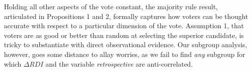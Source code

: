 \documentclass[11pt]{article}
\begin{document}

Holding all other aspects of the vote constant, the majority rule result, articulated in Propositions 1 and 2, formally captures  how voters can be thought accurate with respect to a particular dimension of the vote. %
Assumption 1, that voters are as good or better than random at selecting the superior candidate, is tricky to substantiate with direct observational evidence. Our subgroup analysis, however, goes some distance to allay worries, as we fail to find \emph{any} subgroup for which $\Delta RDI$  and the variable \emph{retrospective} are anti-correlated. %

\end{document}
